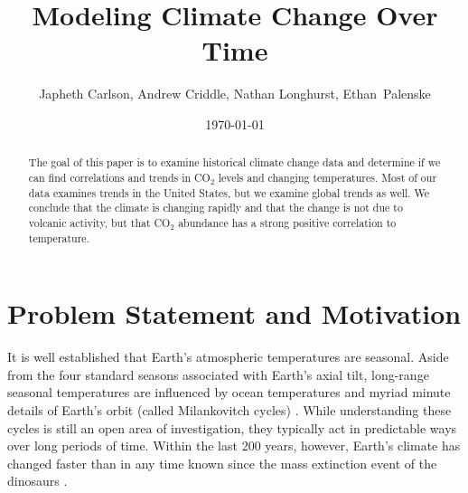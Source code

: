 \documentclass[11pt]{amsart}
\title{Modeling Climate Change Over Time}
\author{Japheth Carlson, Andrew Criddle, Nathan Longhurst, Ethan~Palenske}
\date{\today} %
\begin{document}
\begin{abstract}
\par The goal of this paper is to examine historical climate change data and determine if we can find correlations and trends in CO$_2$ levels and changing temperatures. Most of our data examines trends in the United States, but we examine global trends as well. We conclude that the climate is changing rapidly and that the change is not due to volcanic activity, but that CO$_2$ abundance has a strong positive correlation to temperature.

\end{abstract}

\maketitle %

\section{Problem Statement and Motivation}


It is well established that Earth's atmospheric temperatures are seasonal.  
Aside from the four standard seasons associated with Earth's axial tilt, long-range seasonal temperatures are influenced by ocean temperatures and myriad minute details of Earth's orbit (called Milankovitch cycles) \cite{milankovitch1941canon}.
While understanding these cycles is still an open area of investigation, they typically act in predictable ways over long periods of time.  
Within the last 200 years, however, Earth's climate has changed faster than in any time known since the mass extinction event of the dinosaurs \cite{mulkern2013climatechange}.
\end{document}
